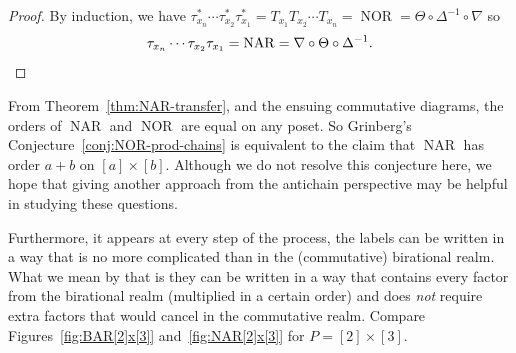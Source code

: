 \documentclass[10pt]{amsart}
\theoremstyle{definition}
\newcommand{\defn}[1]{\emph{#1}}
\newcommand{\down}{\nabla}
\newcommand{\up}{\Delta}
\DeclareMathOperator{\NAR}{NAR}
\DeclareMathOperator{\NOR}{NOR}
\begin{document}
\begin{proof}
By induction, we have $\tau_{x_n}^*\cdots \tau_{x_2}^* \tau_{x_1}^* = T_{x_1} T_{x_2} \cdots T_{x_n} = \NOR = \Theta\circ\up^{-1}\circ \down$ so
\[
\tau_{x_n}\cdots \tau_{x_2} \tau_{x_1} = \NAR
=\down\circ\Theta\circ\up^{-1}.\qedhere
\]
\end{proof}

From Theorem~\ref{thm:NAR-transfer}, and the ensuing commutative diagrams, the orders of $\NAR$ and $\NOR$ are equal on any poset. So Grinberg's Conjecture~\ref{conj:NOR-prod-chains}
is equivalent to the claim that $\NAR$ has order $a+b$ on
$[a]\times[b]$. Although we do not resolve this conjecture here, we hope that giving another approach from the antichain perspective may be helpful in studying these questions. 

Furthermore, it appears at every step of the process, the labels can be written in a way that is no more complicated than in the (commutative) birational realm. What we mean by that is they can be written in a way that contains every factor from the birational realm (multiplied in a certain order) and does \defn{not} require extra factors that would cancel in the commutative realm.
Compare Figures~\ref{fig:BAR[2]x[3]} and~\ref{fig:NAR[2]x[3]} for $P=[2]\times[3]$.
\end{document}
